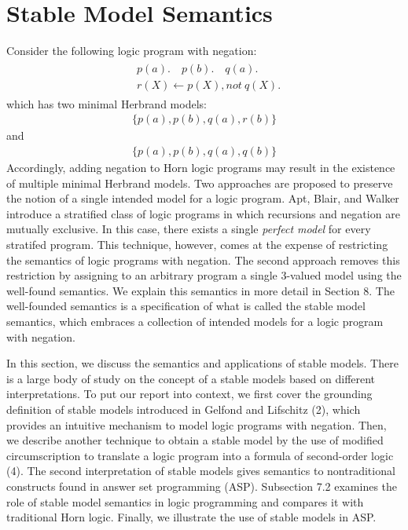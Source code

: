 \section{Stable Model Semantics}
Consider the following logic program with negation:
\begin{align}
    \begin{split}
        & p(a). \hspace{1em} p(b). \hspace{1em} q(a). \\
        & r(X) \leftarrow p(X), not \: q(X).
    \end{split}
\end{align}
which has two minimal Herbrand models:
\begin{align}
    \{p(a),p(b),q(a),r(b)\}
\end{align}
and 
\begin{align}
    \{p(a),p(b),q(a),q(b)\}
\end{align}
Accordingly, adding negation to Horn logic programs may result in the existence of multiple minimal Herbrand models. 
Two approaches are proposed to preserve the notion of a single intended model for a logic program. 
Apt, Blair, and Walker introduce a stratified class of logic programs in which recursions and negation are 
mutually exclusive. In this case, there exists a single \textit{perfect model} for every stratifed program. 
This technique, however, comes at the expense of restricting the semantics of logic programs with negation. 
The second approach removes this restriction by assigning to an arbitrary program a single 3-valued 
model using the well-found semantics. We explain this semantics in more detail in Section 8. The 
well-founded semantics is a specification of what is called the stable model semantics, which 
embraces a collection of intended models for a logic program with negation.

In this section, we discuss the semantics and applications of stable models. There is a large body 
of study on the concept of a stable models based on different interpretations. To put our report into 
context, we first cover the grounding definition of stable models introduced in Gelfond and Lifschitz (2), 
which provides an intuitive mechanism to model logic programs with negation. Then, we describe another 
technique to obtain a stable model by the use of modified circumscription to translate a logic program 
into a formula of second-order logic (4). The second interpretation of stable models gives semantics 
to nontraditional constructs found in answer set programming (ASP). Subsection 7.2 examines the role of 
stable model semantics in logic programming and compares it with traditional Horn logic. Finally, 
we illustrate the use of stable models in ASP. 
 
